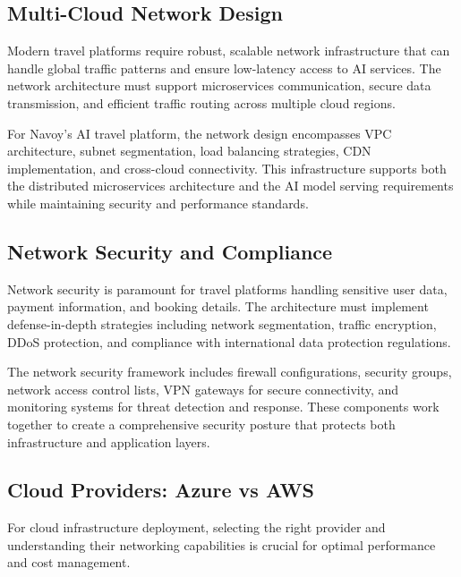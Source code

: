 \subsection{Multi-Cloud Network Design}
Modern travel platforms require robust, scalable network infrastructure that can handle global traffic patterns and ensure low-latency access to AI services. The network architecture must support microservices communication, secure data transmission, and efficient traffic routing across multiple cloud regions.

For Navoy's AI travel platform, the network design encompasses VPC architecture, subnet segmentation, load balancing strategies, CDN implementation, and cross-cloud connectivity. This infrastructure supports both the distributed microservices architecture and the AI model serving requirements while maintaining security and performance standards.

\subsection{Network Security and Compliance}
Network security is paramount for travel platforms handling sensitive user data, payment information, and booking details. The architecture must implement defense-in-depth strategies including network segmentation, traffic encryption, DDoS protection, and compliance with international data protection regulations.

The network security framework includes firewall configurations, security groups, network access control lists, VPN gateways for secure connectivity, and monitoring systems for threat detection and response. These components work together to create a comprehensive security posture that protects both infrastructure and application layers.

\subsection{Cloud Providers: Azure vs AWS}
For cloud infrastructure deployment, selecting the right provider and understanding their networking capabilities is crucial for optimal performance and cost management.

